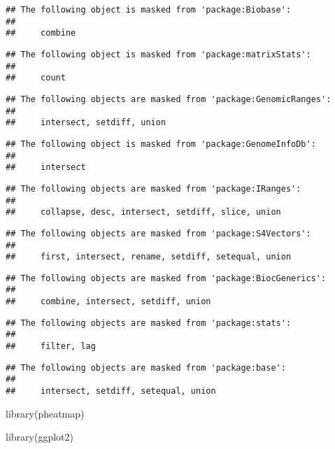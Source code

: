 \documentclass[
]{article}
\newenvironment{Shaded}{\begin{snugshade}}{\end{snugshade}}
\newcommand{\FunctionTok}[1]{\textcolor[rgb]{0.00,0.00,0.00}{#1}}
\newcommand{\NormalTok}[1]{#1}
\begin{document}
\begin{verbatim}
## The following object is masked from 'package:Biobase':
## 
##     combine
\end{verbatim}

\begin{verbatim}
## The following object is masked from 'package:matrixStats':
## 
##     count
\end{verbatim}

\begin{verbatim}
## The following objects are masked from 'package:GenomicRanges':
## 
##     intersect, setdiff, union
\end{verbatim}

\begin{verbatim}
## The following object is masked from 'package:GenomeInfoDb':
## 
##     intersect
\end{verbatim}

\begin{verbatim}
## The following objects are masked from 'package:IRanges':
## 
##     collapse, desc, intersect, setdiff, slice, union
\end{verbatim}

\begin{verbatim}
## The following objects are masked from 'package:S4Vectors':
## 
##     first, intersect, rename, setdiff, setequal, union
\end{verbatim}

\begin{verbatim}
## The following objects are masked from 'package:BiocGenerics':
## 
##     combine, intersect, setdiff, union
\end{verbatim}

\begin{verbatim}
## The following objects are masked from 'package:stats':
## 
##     filter, lag
\end{verbatim}

\begin{verbatim}
## The following objects are masked from 'package:base':
## 
##     intersect, setdiff, setequal, union
\end{verbatim}

\begin{Shaded}
\begin{Highlighting}[]
\FunctionTok{library}\NormalTok{(pheatmap)}
\end{Highlighting}
\end{Shaded}

\begin{Shaded}
\begin{Highlighting}[]
\FunctionTok{library}\NormalTok{(ggplot2)}
\end{Highlighting}
\end{Shaded}
\end{document}
